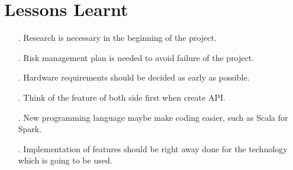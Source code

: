 \documentclass[prodmode,acmtosem]{acmsmall} %
\begin{document}
\section{Lessons Learnt}
\begin{itemize}
\item[.] Research is necessary in the beginning of the project.\\
\item[.] Risk management plan is needed to avoid failure of the project.\\
\item[.] Hardware requirements should be decided as early as possible.\\
\item[.] Think of the feature of both side first when create API.\\
\item[.] New programming language maybe make coding easier, such as Scala for Spark.\\
\item[.] Implementation of features should be right away done for the technology which is going to be used.\\
\end{itemize}
\end{document}
